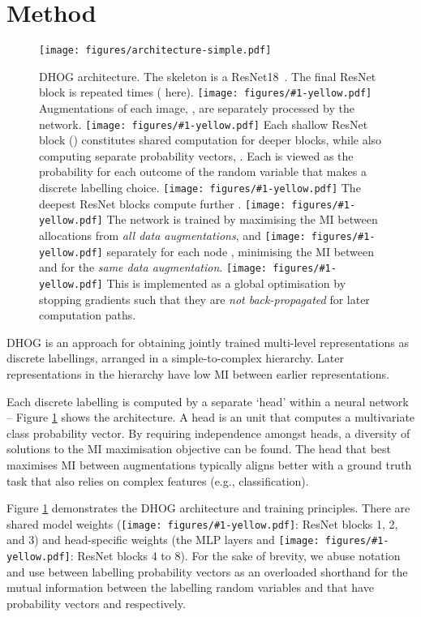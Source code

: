 \documentclass[runningheads]{llncs}
\newcommand*\yellowcircle[1]{\protect\texttt{[image: figures/\#1-yellow.pdf]}}
\begin{document}
\section{Method}\label{sec:method}
\begin{figure}[!htb]
\begin{center}
\texttt{[image: figures/architecture-simple.pdf]}

  \caption{DHOG architecture. The skeleton is a ResNet18~\cite{he2016identity}. The final ResNet block is repeated  times ( here). \yellowcircle{1}  Augmentations of each image, , are separately processed by the network. \yellowcircle{2} Each shallow ResNet block () constitutes shared computation for deeper blocks, while also computing separate probability vectors, . Each  is viewed as the probability for each outcome of the random variable  that makes a discrete labelling choice. \yellowcircle{3} The deepest ResNet blocks compute further . \yellowcircle{4} The network is trained by maximising the MI between allocations  from \emph{all data augmentations}, and \yellowcircle{5} separately for each node , minimising the MI between  and  for the \emph{same data augmentation}. \yellowcircle{6} This is implemented as a global optimisation by stopping gradients such that they are \emph{not back-propagated} for later computation paths.
  \label{fig:architecture}}
 \end{center}

\end{figure}
DHOG is an approach for obtaining jointly trained multi-level representations as discrete labellings, arranged in a simple-to-complex hierarchy. Later representations in the hierarchy have low MI between earlier representations. 


Each discrete labelling is computed by a separate `head' within a neural network -- Figure \ref{fig:architecture} shows the architecture. A head is an unit that computes a multivariate class probability vector. By requiring independence amongst heads, a diversity of solutions to the MI maximisation objective can be found. The head that best maximises MI between augmentations typically aligns better with a ground truth task that also relies on complex features (e.g., classification).



Figure \ref{fig:architecture} demonstrates the DHOG architecture and training principles. There are shared model weights (\yellowcircle{2}: ResNet blocks 1, 2, and 3) and head-specific weights (the MLP layers and \yellowcircle{3}: ResNet blocks 4 to 8). For the sake of brevity, we abuse notation and use  between labelling probability vectors as an overloaded shorthand for the mutual information   between the labelling random variables  and  that have probability vectors  and  respectively.
\end{document}
